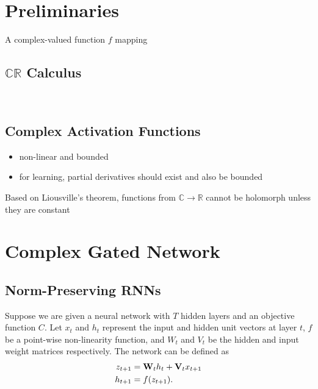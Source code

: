 \documentclass{article}
\begin{document}
\section{Preliminaries}
A complex-valued function $f$ mapping 


\subsection{$\mathbb{C}\mathbb{R}$ Calculus}
\\


\subsection{Complex Activation Functions}
\begin{itemize}
    \item non-linear and bounded
    \item for learning, partial derivatives should exist and also be bounded
\end{itemize}

Based on Liousville's theorem, functions from $\mathbb{C} \rightarrow \mathbb{R}$ cannot be holomorph unless they are constant


\section{Complex Gated Network}
\subsection{Norm-Preserving RNNs}
Suppose we are given a neural network with $T$ hidden layers and an objective function $C$.  Let $x_t$ and $h_t$ represent the input and hidden unit vectors at layer $t$, $f$ be a point-wise non-linearity function, and $W_t$ and $V_t$ be the hidden and input weight matrices respectively.  The network can be defined as
\begin{align}
    z_{t+1} &= \mathbf{W}_t h_t + \mathbf{V}_t x_{t+1} \\
    h_{t+1} &= f(z_{t+1}).
\end{align}
\end{document}
